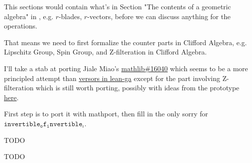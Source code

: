 This sections would contain what's in Section "The contents of a geometric algebra" in \cite{chisolm2012geometric}, e.g. $r$-blades, $r$-vectors, before we can discuss anything for the operations.

That means we need to first formalize the counter parts in Clifford Algebra, e.g. Lipschitz Group, Spin Group, and Z-filteration in Clifford Algebra.

I'll take a stab at porting Jiale Miao's \href{https://github.com/leanprover-community/mathlib/pull/16040}{mathlib\#16040} which seems to be a more principled attempt than \href{https://github.com/pygae/lean-ga/blob/master/src/geometric_algebra/from_mathlib/versors.lean}{versors in lean-ga} except for the part involving Z-filteration which is still worth porting, possibly with ideas from the prototype \href{https://github.com/eric-wieser/lftcm2023-clifford_algebra/}{here}.

First step is to port it with mathport, then fill in the only sorry for $\mathtt{invertible_of_invertible_ι}$.

\begin{definition}
    \label{Lipschitz}
    \tangled

    TODO

\end{definition}

\begin{definition}
    \label{SpinGroup}
    \tangled

    TODO

\end{definition}